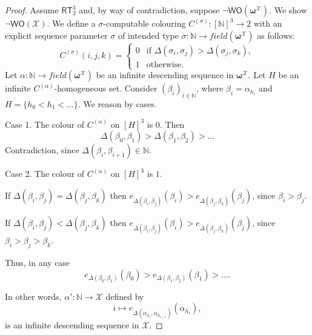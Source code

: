 \documentclass{amsart}
\newcommand\Nat{\mathbb{N}}
\newcommand\RT{\mathsf{RT}}
\newcommand\WO{\mathsf{WO}}
\newcommand{\LoX}{\mathcal{X}}
\newcommand\boldomega{\pmb{\omega}}
\begin{document}
\begin{proof}
Assume $\RT^3_2$ and, by way of contradiction, suppose $\neg \WO(\boldomega^\LoX)$. We show $\neg \WO(\LoX)$. 
We define a $\sigma$-computable colouring $C^{(\sigma)}:[\Nat]^3\to 2$ with an explicit sequence parameter
$\sigma$ of intended type $\sigma:\Nat\to field(\boldomega^\LoX)$ as follows: 
$$C^{(\sigma)}(i,j,k)=
\begin{cases}
0 & \mbox{if } \Delta(\sigma_i,\sigma_j) > \Delta(\sigma_j,\sigma_k),\\
1 & \mbox{otherwise.} 
\end{cases}
$$
Let $\alpha:\Nat\to field(\boldomega^\LoX)$ be an infinite descending sequence
in $\boldomega^\LoX$. 
Let $H$ be an infinite $C^{(\alpha)}$-homogeneous set. 
Consider $(\beta_i)_{i\in \Nat}$, where $\beta_i = \alpha_{h_i}$ and $H=\{h_0 < h_1 < \dots\}$. We reason by cases.

Case 1. The colour of $C^{(\alpha)}$ on $[H]^3$ is $0$. Then 
$$ \Delta(\beta_0,\beta_1) > \Delta(\beta_1,\beta_2) > \dots$$
Contradiction, since $\Delta(\beta_i,\beta_{i+1})\in \Nat$.


Case 2. The colour of $C^{(\alpha)}$ on $[H]^3$ is $1$. 

If $\Delta(\beta_i,\beta_j)=\Delta(\beta_j,\beta_k)$ then $e_{\Delta(\beta_i,\beta_j)}(\beta_i)> e_{\Delta(\beta_j,\beta_k)}(\beta_j)$, since 
$\beta_i>\beta_j$. 

If $\Delta(\beta_i,\beta_j) < \Delta(\beta_j,\beta_k)$ then 
$e_{\Delta(\beta_i,\beta_j)}(\beta_i) > e_{\Delta(\beta_j,\beta_k)}(\beta_j)$,
since $\beta_i > \beta_j > \beta_k$. 

Thus, in any case
$$ e_{\Delta(\beta_0,\beta_1)}(\beta_0) > e_{\Delta(\beta_1,\beta_2)}(\beta_1) > \dots.$$

In other words, $\alpha':\Nat\to \LoX$ defined by 
$$ i \mapsto e_{\Delta(\alpha_{h_i},\alpha_{h_{i+1}})}(\alpha_{h_i}),$$
is an infinite descending sequence in $\LoX$. 
\end{proof}
\end{document}
